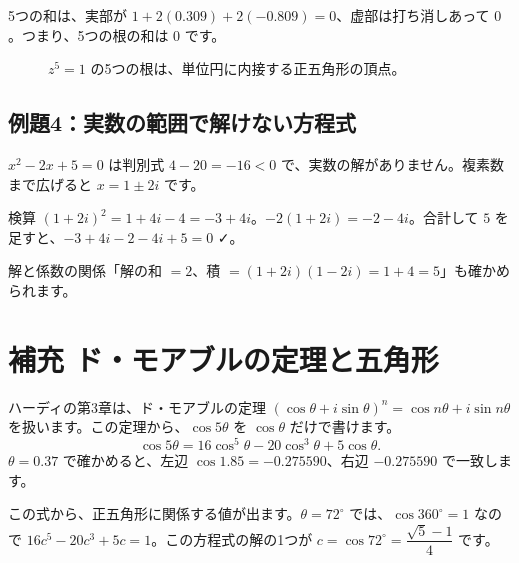 \documentclass[a4paper,11pt,openany]{ltjsbook}
\begin{document}
5つの和は、実部が $1+2(0.309)+2(-0.809)=0$、虚部は打ち消しあって $0$。つまり、5つの根の和は $0$ です。

\begin{figure}[htbp]
\centering
{}
\caption{$z^5=1$ の5つの根は、単位円に内接する正五角形の頂点。}
\end{figure}

\subsection*{例題4：実数の範囲で解けない方程式}

$x^2-2x+5=0$ は判別式 $4-20=-16<0$ で、実数の解がありません。複素数まで広げると $x=1\pm2i$ です。

\begin{examplebox}{検算}
$(1+2i)^2=1+4i-4=-3+4i$。$-2(1+2i)=-2-4i$。合計して $5$ を足すと、$-3+4i-2-4i+5=0$ ✓。
\end{examplebox}

解と係数の関係「解の和 $=2$、積 $=(1+2i)(1-2i)=1+4=5$」も確かめられます。

\section{補充 ド・モアブルの定理と五角形}

ハーディの第3章は、ド・モアブルの定理 $(\cos\theta+i\sin\theta)^n=\cos n\theta+i\sin n\theta$ を扱います。この定理から、$\cos5\theta$ を $\cos\theta$ だけで書けます。
\[
\cos5\theta=16\cos^5\theta-20\cos^3\theta+5\cos\theta .
\]
$\theta=0.37$ で確かめると、左辺 $\cos1.85=-0.275590$、右辺 $-0.275590$ で一致します。

この式から、正五角形に関係する値が出ます。$\theta=72^\circ$ では、$\cos360^\circ=1$ なので $16c^5-20c^3+5c=1$。この方程式の解の1つが $c=\cos72^\circ=\dfrac{\sqrt5-1}4$ です。
\end{document}
